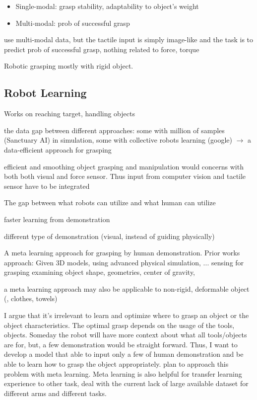 \begin{itemize}
	\item Single-modal: grasp stability, adaptability to object's weight \cite{bekiroglu2011assessing, li2014learning}
	\item Multi-modal: \ac{prob} of successful grasp \cite{calandra2017feeling}
\end{itemize}

\cite{calandra2017feeling} use multi-modal data, but the tactile input is simply image-like and the task is to predict prob of successful grasp, nothing related to force, torque

Robotic grasping mostly with rigid object.

\subsection{Robot Learning}
Works on reaching target, handling objects

the data gap between different approaches: some with million of samples (Sanctuary AI) in simulation, some with collective robots learning (google) $\rightarrow$ a data-efficient approach for grasping

efficient and smoothing object grasping and manipulation would concerns with both both visual and force sensor. Thus input from computer vision and tactile sensor have to be integrated \cite{haddadin2018tactile}

The gap between what robots can utilize and what human can utilize

faster learning from demonstration

different type of demonstration (visual, instead of guiding physically)

A meta learning approach for grasping by human demonstration. Prior works approach:
Given 3D models, using advanced physical simulation, ...
sensing for grasping
examining object shape, geometries, center of gravity, \etc

a meta learning approach may also be applicable to non-rigid, deformable object (\eg, clothes, towels)

I argue that it's irrelevant to learn and optimize where to grasp an object or the object characteristics. The optimal grasp depends on the usage of the tools, objects. Someday the robot will have more context about what all tools/objects are for, but, a few demonstration would be straight forward. Thus, I want to develop a model that able to input only a few of human demonstration and be able to learn how to grasp the object appropriately.
plan to approach this problem with meta learning. Meta learning is also helpful for transfer learning experience to other task, deal with the current lack of large available dataset for different arms and different tasks.

